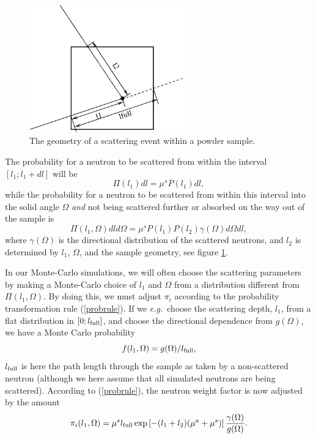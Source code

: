 \begin{figure}
  \begin{center}
    \includegraphics[width=0.6\textwidth]{figures/scatter.eps}
  \end{center}
\caption{The geometry of a scattering event within a powder sample.}
\label{powderFig}
\end{figure}

The probability for a neutron to be scattered from within the interval
$[ l_1 ; l_1+dl ]$ will be
\begin{equation}
\Pi(l_1) dl = \mu^s P(l_1) dl ,
\end{equation}
while the probability for a neutron to be scattered from within
this interval into the solid angle $\Omega$ {\em and}
not being scattered further
or absorbed on the way out of the sample is
\begin{equation}
\Pi(l_1,\Omega) dl d\Omega = 
  \mu^s P(l_1) P(l_2) \gamma(\Omega) d\Omega dl ,
\end{equation}
where $\gamma(\Omega)$ is the directional distribution
of the scattered neutrons, and $l_2$ is determined by $l_1$, 
$\Omega$, and the sample geometry, see figure \ref{powderFig}.

In our Monte-Carlo simulations, we will often choose the scattering
parameters by making a Monte-Carlo choice of $l_1$ and $\Omega$
from a distribution different from $\Pi(l_1,\Omega)$.
By doing this, we must adjust $\pi_i$ according to
the probability transformation rule (\ref{probrule}).
If we {\em e.g.}\ choose the scattering depth, $l_1$,
from a flat distribution in $[ 0 ; l_{\rm full} ]$, 
and choose the directional dependence from $g(\Omega)$,
we have a Monte Carlo probability
\begin{equation}
f(l_1,\Omega) = g(\Omega) / l_{\rm full} ,
\end{equation}
$l_{\rm full}$ is here the path length through the sample
as taken by a non-scattered neutron (although we here 
assume that all simulated neutrons are being scattered).
According to (\ref{probrule}), the neutron weight factor
is now adjusted by the amount
\begin{equation}     \label{sampleprob}
\pi_i(l_1,\Omega) =
 \mu^s l_{\rm full} \exp \left[ - (l_1+l_2) (\mu^a + \mu^s) \right]
  \frac{\gamma(\Omega)}{g(\Omega)} .
\end{equation}

